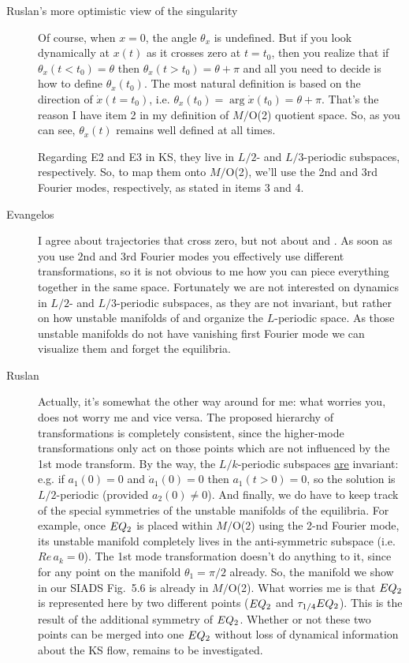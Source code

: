 \begin{description}
\item[Ruslan's more optimistic view of the singularity] Of
course, when $x = 0$, the angle $\theta_x$ is undefined.  But
if you look dynamically at $x(t)$ as it crosses zero at $t =
t_0$, then you realize that if $\theta_x(t < t_0) = \theta$
then $\theta_x(t > t_0) = \theta + \pi$ and all you need to
decide is how to define $\theta_x(t_0)$.  The most natural
definition is based on the direction of $\dot{x}(t = t_0)$,
i.e. $\theta_x(t_0) = \arg \dot{x}(t_0) = \theta + \pi$.
That's the reason I have item 2 in my definition of $M/$O(2)
quotient space.  So, as you can see, $\theta_x(t)$ remains
well defined at all times.

Regarding E2 and E3 in KS, they live in $L/2$- and
$L/3$-periodic subspaces, respectively.  So, to map them onto
$M/$O(2), we'll use the 2nd and 3rd Fourier modes,
respectively, as stated in items 3 and 4.

\item[Evangelos]
I agree about trajectories that cross zero, but not about
 and . As soon as you use 2nd and 3rd Fourier
modes you effectively use different transformations, so it is
not obvious to me how you can piece everything together in
the same space. Fortunately we are not interested on dynamics
in $L/2$- and $L/3$-periodic subspaces, as they are not
invariant, but rather on how unstable manifolds of 
and  organize the $L$-periodic space. As those
unstable manifolds do not have vanishing first Fourier mode
we can visualize them and forget the equilibria.

\item[Ruslan]
  Actually, it's somewhat the other way
around for me: what worries you, does not worry me and vice
versa.  The proposed hierarchy of transformations is
completely consistent, since the higher-mode transformations
only act on those {\statesp} points which are not influenced
by the 1st mode transform.  By the way, the $L/k$-periodic
subspaces \underline{are} invariant: e.g. if $a_1(0) = 0$ and
$\dot{a}_1(0) = 0$ then $a_1(t>0) = 0$, so the solution is
$L/2$-periodic (provided $a_2(0) \neq 0$).  And finally, we
do have to keep track of the special symmetries of the
unstable manifolds of the equilibria.  For example, once
$EQ_{2}$ is placed within $M/$O(2) using the 2-nd Fourier
mode, its unstable manifold completely lives in the
anti-symmetric subspace (i.e. $Re\,a_k = 0$). {\color{blue}
The 1st mode transformation doesn't do anything to it, since
for any point on the manifold $\theta_1 = \pi/2$ already.}
So, the manifold we show in our SIADS Fig.~5.6 is already in
$M/$O(2).  What worries me is that $EQ_{2}$ is represented
here by two different points ($EQ_{2}$ and
$\tau_{1/4}EQ_{2}$).  This is the result of the additional
symmetry of $EQ_{2}$.  Whether or not these two points can
be merged into one $EQ_{2}$ without loss of dynamical
information about the KS flow, remains to be investigated.


\end{description}
